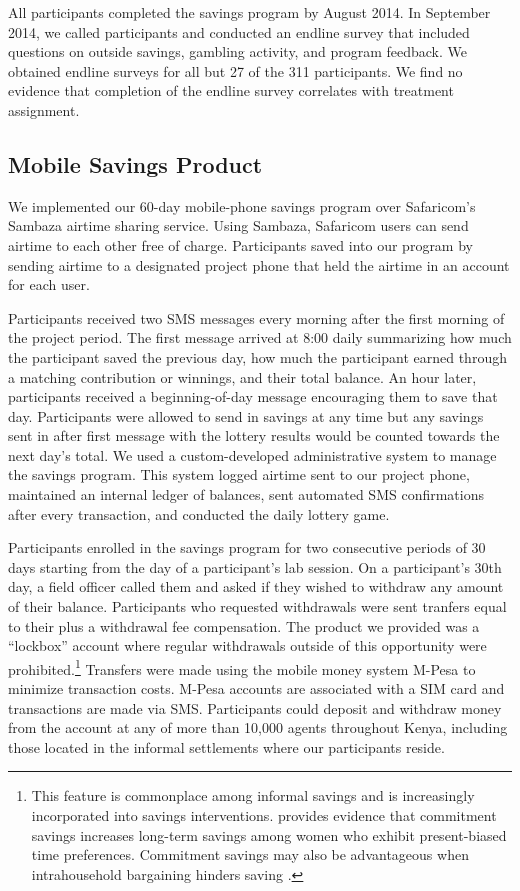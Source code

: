 \documentclass[11pt]{article}
\begin{document}
		All participants completed the savings program by August 2014. In September 2014, we called participants and conducted an endline survey that included questions on outside savings, gambling activity, and program feedback. We obtained endline surveys for all but 27 of the 311 participants. We find no evidence that completion of the endline survey correlates with treatment assignment.

		\clearpage

	\subsection{Mobile Savings Product}

		We implemented our 60-day mobile-phone savings program over Safaricom's Sambaza airtime sharing service. Using Sambaza, Safaricom users can send airtime to each other free of charge. Participants saved into our program by sending airtime to a designated project phone that held the airtime in an account for each user.

		Participants received two SMS messages every morning after the first morning of the project period. The first message arrived at 8:00 daily summarizing how much the participant saved the previous day, how much the participant earned through a matching contribution or winnings, and their total balance. An hour later, participants received a beginning-of-day message encouraging them to save that day. Participants were allowed to send in savings at any time but any savings sent in after first message with the lottery results would be counted towards the next day's total. We used a custom-developed administrative system to manage the savings program. This system logged airtime sent to our project phone, maintained an internal ledger of balances, sent automated SMS confirmations after every transaction, and conducted the daily lottery game.

		Participants enrolled in the savings program for two consecutive periods of 30 days starting from the day of a participant's lab session. On a participant's 30th day, a field officer called them and asked if they wished to withdraw any amount of their balance. Participants who requested withdrawals were sent tranfers equal to their plus a withdrawal fee compensation. The product we provided was a ``lockbox'' account where regular withdrawals outside of this opportunity were prohibited.\footnote{This feature is commonplace among informal savings and is increasingly incorporated into savings interventions. \textcite{ashraf_tying_2006} provides evidence that commitment savings increases long-term savings among women who exhibit present-biased time preferences. Commitment savings may also be advantageous when intrahousehold bargaining hinders saving \parencite{banerjee_economic_2007,schaner_cost_2011}.} Transfers were made using the mobile money system M-Pesa to minimize transaction costs. M-Pesa accounts are associated with a SIM card and transactions are made via SMS. Participants could deposit and withdraw money from the account at any of more than 10,000 agents throughout Kenya, including those located in the informal settlements where our participants reside.
\end{document}
